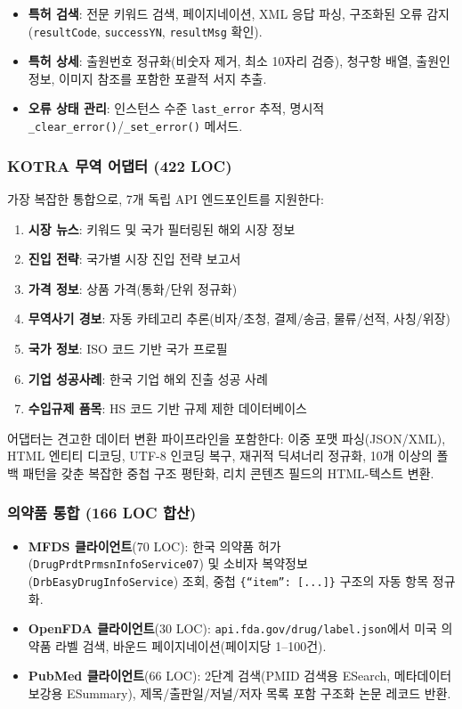 \documentclass[preprint,12pt]{elsarticle}
\begin{document}
\begin{itemize}
  \item \textbf{특허 검색}: 전문 키워드 검색, 페이지네이션, XML 응답 파싱, 구조화된 오류 감지(\texttt{resultCode}, \texttt{successYN}, \texttt{resultMsg} 확인).
  \item \textbf{특허 상세}: 출원번호 정규화(비숫자 제거, 최소 10자리 검증), 청구항 배열, 출원인 정보, 이미지 참조를 포함한 포괄적 서지 추출.
  \item \textbf{오류 상태 관리}: 인스턴스 수준 \texttt{last\_error} 추적, 명시적 \texttt{\_clear\_error()}/\texttt{\_set\_error()} 메서드.
\end{itemize}

\subsubsection{KOTRA 무역 어댑터 (422 LOC)}

가장 복잡한 통합으로, 7개 독립 API 엔드포인트를 지원한다:

\begin{enumerate}
  \item \textbf{시장 뉴스}: 키워드 및 국가 필터링된 해외 시장 정보
  \item \textbf{진입 전략}: 국가별 시장 진입 전략 보고서
  \item \textbf{가격 정보}: 상품 가격(통화/단위 정규화)
  \item \textbf{무역사기 경보}: 자동 카테고리 추론(비자/초청, 결제/송금, 물류/선적, 사칭/위장)
  \item \textbf{국가 정보}: ISO 코드 기반 국가 프로필
  \item \textbf{기업 성공사례}: 한국 기업 해외 진출 성공 사례
  \item \textbf{수입규제 품목}: HS 코드 기반 규제 제한 데이터베이스
\end{enumerate}

어댑터는 견고한 데이터 변환 파이프라인을 포함한다: 이중 포맷 파싱(JSON/XML), HTML 엔티티 디코딩, UTF-8 인코딩 복구, 재귀적 딕셔너리 정규화, 10개 이상의 폴백 패턴을 갖춘 복잡한 중첩 구조 평탄화, 리치 콘텐츠 필드의 HTML-텍스트 변환.

\subsubsection{의약품 통합 (166 LOC 합산)}

\begin{itemize}
  \item \textbf{MFDS 클라이언트}(70 LOC): 한국 의약품 허가(\texttt{DrugPrdtPrmsnInfoService07}) 및 소비자 복약정보(\texttt{DrbEasyDrugInfoService}) 조회, 중첩 \texttt{\{``item'': [...]\}} 구조의 자동 항목 정규화.
  \item \textbf{OpenFDA 클라이언트}(30 LOC): \texttt{api.fda.gov/drug/label.json}에서 미국 의약품 라벨 검색, 바운드 페이지네이션(페이지당 1--100건).
  \item \textbf{PubMed 클라이언트}(66 LOC): 2단계 검색(PMID 검색용 ESearch, 메타데이터 보강용 ESummary), 제목/출판일/저널/저자 목록 포함 구조화 논문 레코드 반환.
\end{itemize}
\end{document}
